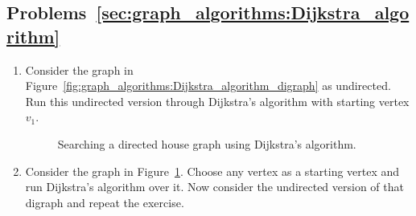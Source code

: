 \subsection*{Problems~\ref{sec:graph_algorithms:Dijkstra_algorithm}}

\begin{enumerate}
\item Consider the graph in
  Figure~\ref{fig:graph_algorithms:Dijkstra_algorithm_digraph} as
  undirected. Run this undirected version through Dijkstra's algorithm
  with starting vertex $v_1$.

\begin{figure}[!htbp]
\centering
{}
\caption{Searching a directed house graph using Dijkstra's algorithm.}
\label{fig:graph_algorithms:Dijkstra_directed_house_graph}
\end{figure}

\item Consider the graph in
  Figure~\ref{fig:graph_algorithms:Dijkstra_directed_house_graph}. Choose
  any vertex as a starting vertex and run Dijkstra's algorithm over
  it. Now consider the undirected version of that digraph and repeat
  the exercise.
\end{enumerate}



